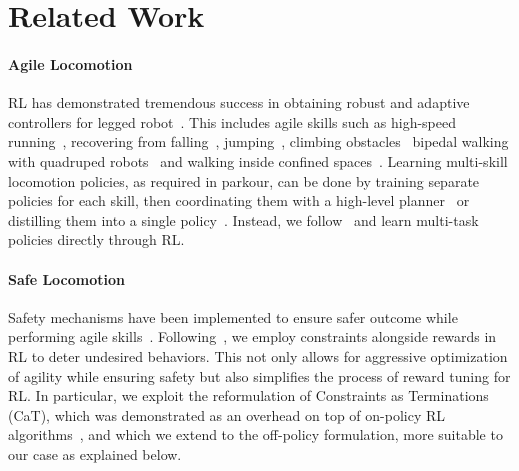 \section{Related Work}

\paragraph{Agile Locomotion}
RL has demonstrated tremendous success in obtaining robust and adaptive controllers for legged robot~\citep{peng2020learning, fu2021minimizing,  kumar2021rma, rudin2022learning, aractingi2023controlling}.
This includes agile skills such as high-speed running~\citep{bellegarda2022robust,caluwaerts2023barkour, margolis2024rapid, he2024agile}, recovering from falling~\citep{hwangbo2019learning,yang2020multi,smith2022legged, inoue2024body}, jumping~\citep{bellegarda2020robust, margolis2021learning, li2023robust, smith2023learning, li2023learning, yang2023generalized, li2024reinforcement, zhang2024learning},
climbing obstacles~\cite{lee2020learning, siekmann2021blind,miki2022learning,hoeller2022neural,rudin2022advanced,agarwal2023legged,yang2023neural,loquercio2023learning, chane2024cat, cheng2024quadruped, hoeller2024anymal,zhuang2023robot,cheng2023parkour}
bipedal walking with quadruped robots~\citep{fuchioka2023opt,li2023learning,smith2023learning,cheng2023parkour,huang2024diffuseloco} and walking inside confined spaces~\citep{miki2024learning, xu2024dexterous, cheng2024quadruped}.
Learning multi-skill locomotion policies, as required in parkour, can be done by training separate policies for each skill, then coordinating them with a high-level planner~\citep{yang2020multi, kim2022humanconquad, huang2023creating, hoeller2024anymal} or distilling them into a single policy~\citep{caluwaerts2023barkour, zhuang2023robot, huang2024diffuseloco}.
Instead, we follow~\citep{cheng2023parkour} and learn multi-task policies directly through RL.

\paragraph{Safe Locomotion}
Safety mechanisms have been implemented to ensure safer outcome while performing agile skills~\citep{yang2022safe, he2024agile}.
Following~\citep{lee2023evaluation, kim2024not,chane2024cat}, we employ constraints alongside rewards in RL to deter undesired behaviors.
This not only allows for aggressive optimization of agility while ensuring safety but also simplifies the process of reward tuning for RL.
In particular, we exploit the reformulation of Constraints as Terminations~\citep{chane2024cat} (CaT), which was demonstrated as an overhead on top of on-policy RL algorithms~\citep{schulman2017proximal}, and which we extend to the off-policy formulation, more suitable to our case as explained below.


